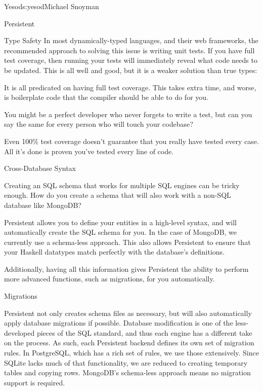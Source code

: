\begin{aosachapter}{Yesod}{s:yesod}{Michael Snoyman}
\begin{aosasect1}{Persistent}
\begin{aosasect2}{Type Safety}
In most dynamically-typed languages, and their web frameworks, the
recommended approach to solving this issue is writing unit tests. If
you have full test coverage, then running your tests will immediately
reveal what code needs to be updated. This is all well and good, but
it is a weaker solution than true types:

\begin{aosaitemize}

\item It is all predicated on having full test coverage. This takes
  extra time, and worse, is boilerplate code that the compiler should
  be able to do for you.

\item You might be a perfect developer who never forgets to write a
  test, but can you say the same for every person who will touch your
  codebase?

\item Even 100\% test coverage doesn't guarantee that you really have
  tested every case. All it's done is proven you've tested every line
  of code.

\end{aosaitemize}

\end{aosasect2}

\begin{aosasect2}{Cross-Database Syntax}

Creating an SQL schema that works for multiple SQL engines can be
tricky enough. How do you create a schema that will also work with a
non-SQL database like MongoDB?

Persistent allows you to define your entities in a high-level syntax,
and will automatically create the SQL schema for you. In the case of
MongoDB, we currently use a schema-less approach. This also allows
Persistent to ensure that your Haskell datatypes match perfectly with
the database's definitions.

Additionally, having all this information gives Persistent the ability
to perform more advanced functions, such as migrations, for you automatically.

\end{aosasect2}

\begin{aosasect2}{Migrations}

Persistent not only creates schema files as necessary, but will also
automatically apply database migrations if possible. Database
modification is one of the less-developed pieces of the SQL standard,
and thus each engine has a different take on the process. As such,
each Persistent backend defines its own set of migration rules. In
PostgreSQL, which has a rich set of  rules, we use
those extensively. Since SQLite lacks much of that functionality, we
are reduced to creating temporary tables and copying rows. MongoDB's
schema-less approach means no migration support is required.


\end{aosasect2}
\end{aosasect1}
\end{aosachapter}
